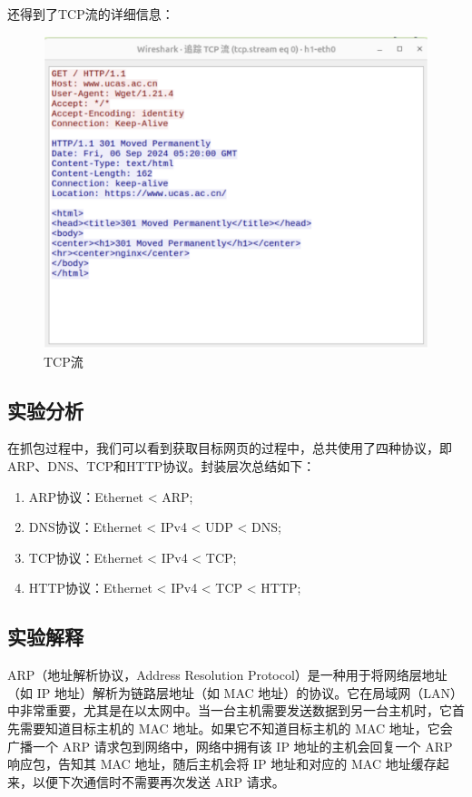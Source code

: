 \documentclass[UTF8]{article}
\begin{document}
还得到了TCP流的详细信息：

\begin{figure}[H]
  \centering
  \includegraphics[width=\textwidth]{TCPflow.png}
  \caption{TCP流}
\end{figure}

\subsection{实验分析}

在抓包过程中，我们可以看到获取目标网页的过程中，总共使用了四种协议，即ARP、DNS、TCP和HTTP协议。封装层次总结如下：

\begin{enumerate}
  \item ARP协议：Ethernet < ARP;
  \item DNS协议：Ethernet < IPv4 < UDP < DNS;
  \item TCP协议：Ethernet < IPv4 < TCP;
  \item HTTP协议：Ethernet < IPv4 < TCP < HTTP;
\end{enumerate}

\subsection{实验解释}

ARP（地址解析协议，Address Resolution Protocol）是一种用于将网络层地址（如 IP 地址）解析为链路层地址（如 MAC 地址）的协议。它在局域网（LAN）中非常重要，尤其是在以太网中。当一台主机需要发送数据到另一台主机时，它首先需要知道目标主机的 MAC 地址。如果它不知道目标主机的 MAC 地址，它会广播一个 ARP 请求包到网络中，网络中拥有该 IP 地址的主机会回复一个 ARP 响应包，告知其 MAC 地址，随后主机会将 IP 地址和对应的 MAC 地址缓存起来，以便下次通信时不需要再次发送 ARP 请求。
\end{document}
